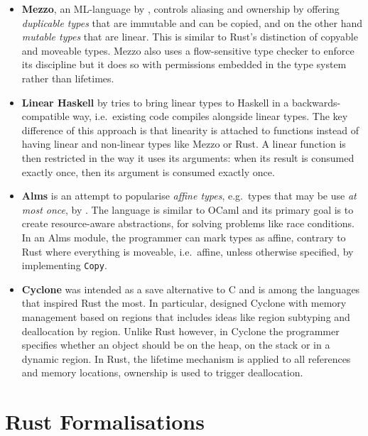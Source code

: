 \begin{itemize}
\item
  \textbf{Mezzo}, an ML-language by \citet{mezzo}, controls aliasing
  and ownership by offering \emph{duplicable types} that are immutable
  and can be copied, and on the other hand \emph{mutable types} that are
  linear. This is similar to Rust's distinction of copyable and moveable
  types. Mezzo also uses a flow-sensitive type checker to enforce its
  discipline but it does so with permissions embedded in the type system
  rather than lifetimes.

\item \textbf{Linear Haskell} by \citet{linear-haskell} tries to bring linear
types to Haskell in a backwards-compatible way, i.e.~existing code compiles
alongside linear types. The key difference of this approach is that linearity is
attached to functions instead of having linear and non-linear types like Mezzo
or Rust. A linear function is then restricted in the way it uses its arguments:
when its result is consumed exactly once, then its argument is consumed exactly
once.

\item
  \textbf{Alms} is an attempt to popularise \emph{affine types},
  e.g.~types that may be use \emph{at most once}, by \citet{alms}. The
  language is similar to OCaml and its primary goal is to create
  resource-aware abstractions, for solving problems like race
  conditions. In an Alms module, the programmer can mark types as
  affine, contrary to Rust where everything is moveable, i.e.~affine,
  unless otherwise specified, by implementing
  \passthrough{\lstinline!Copy!}.

\item
  \textbf{Cyclone} was intended as a save alternative to C and is among
  the languages that inspired Rust the most. In particular,
  \citet{cyclone-region} designed Cyclone with memory management based
  on regions that includes ideas like region subtyping and deallocation
  by region. Unlike Rust however, in Cyclone the programmer specifies
  whether an object should be on the heap, on the stack or in a dynamic
  region. In Rust, the lifetime mechanism is applied to all references
  and memory locations, ownership is used to trigger deallocation.
\end{itemize}


\section{Rust Formalisations}

